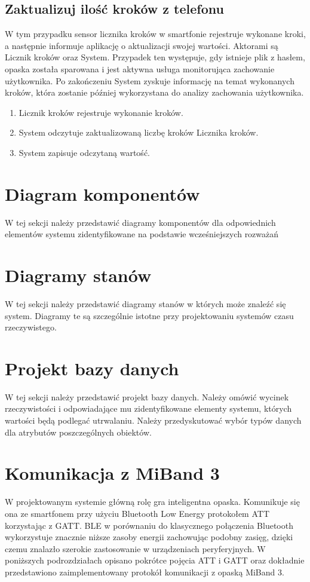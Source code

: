 \subsection{Zaktualizuj ilość kroków z telefonu}
W tym przypadku sensor licznika kroków w smartfonie rejestruje wykonane kroki, a następnie informuje aplikację o aktualizacji swojej wartości. Aktorami są Licznik kroków oraz System. Przypadek ten występuje, gdy istnieje plik z hasłem, opaska została sparowana i jest aktywna usługa monitorująca zachowanie użytkownika. Po zakończeniu System zyskuje informację na temat wykonanych kroków, która zostanie później wykorzystana do analizy zachowania użytkownika.
\begin{enumerate}
    \item Licznik kroków rejestruje wykonanie kroków.
    \item System odczytuje zaktualizowaną liczbę kroków Licznika kroków.
    \item System zapisuje odczytaną wartość.
\end{enumerate}

\section{Diagram komponentów}

W tej sekcji należy przedstawić diagramy komponentów dla odpowiednich elementów systemu zidentyfikowane na podstawie wcześniejszych rozważań

\section{Diagramy stanów}

W tej sekcji należy przedstawić diagramy stanów w których może znaleźć się system. Diagramy te są szczególnie istotne przy projektowaniu systemów czasu rzeczywistego.

\section{Projekt bazy danych}

W tej sekcji należy przedstawić projekt bazy danych. Należy omówić wycinek rzeczywistości i odpowiadające mu zidentyfikowane elementy systemu, których wartości będą podlegać utrwalaniu. Należy przedyskutować wybór typów danych dla atrybutów poszczególnych obiektów.  

\section{Komunikacja z MiBand 3}
W projektowanym systemie główną rolę gra inteligentna opaska. Komunikuje się ona ze smartfonem przy użyciu Bluetooth Low Energy protokołem ATT korzystając z GATT. BLE w porównaniu do klasycznego połączenia Bluetooth wykorzystuje znacznie niższe zasoby energii zachowując podobny zasięg, dzięki czemu znalazło szerokie zastosowanie w urządzeniach peryferyjnych. W poniższych podrozdziałach opisano pokrótce pojęcia ATT i GATT oraz dokładnie przedstawiono zaimplementowany protokół komunikacji z opaską MiBand 3.
